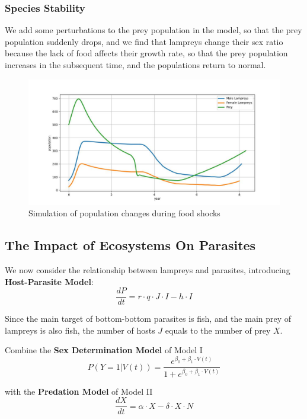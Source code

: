 \documentclass[12pt]{article}  %
\begin{document}
\subsubsection{Species Stability}
We add some perturbations to the prey population in the model, so that the prey population suddenly drops, and we find that lampreys change their sex ratio because the lack of food affects their growth rate, so that the prey population increases in the subsequent time, and the populations return to normal.
\begin{figure}[H] %
	\centering  %
	\includegraphics[width=.6\textwidth]{模拟 (1).jpg} %
	\caption{Simulation of population changes during food shocks}
\end{figure}
\subsection{The Impact of Ecosystems On Parasites}
We now consider the relationship between lampreys and parasites, introducing \textbf{Host-Parasite Model}:
\begin{equation}
		\frac{dP}{dt}=r\cdot q\cdot J\cdot I-h\cdot I
\end{equation}

Since the main target of bottom-bottom parasites is fish, and the main prey of lampreys is also fish, the number of hosts $J$ equals to the number of prey $X$.

Combine the \textbf{Sex Determination Model} of Model I
\begin{equation}
	P\left( \left. Y=1 \right|V\left( t \right) \right) =\frac{e^{\beta _0+\beta _1\cdot V\left( t \right)}}{1+e^{\beta _0+\beta _1\cdot V\left( t \right)}}
\end{equation}

 with the\textbf{ Predation Model} of Model II
 \begin{equation}
 	\frac{dX}{dt}=\alpha\cdot X-\delta \cdot X\cdot N
 \end{equation}
 
\end{document}
